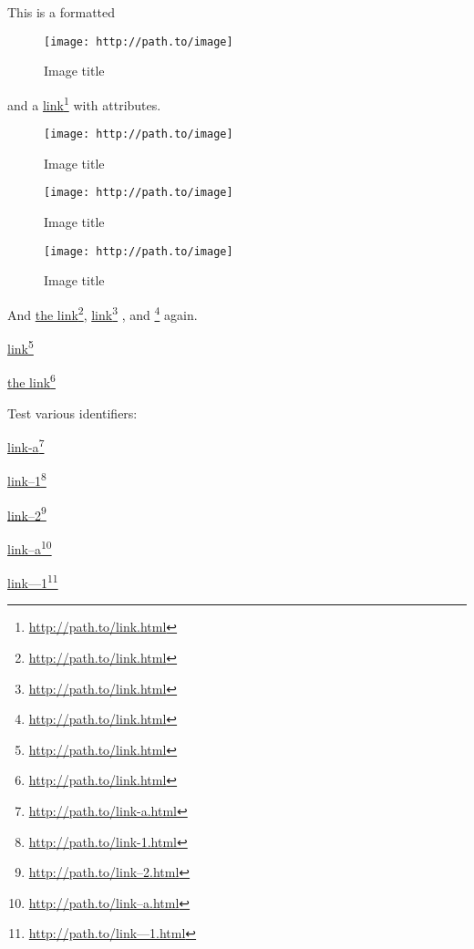 
\def\mytitle{Link Attributes Test}
\def\latexmode{memoir}

This is a formatted \begin{figure}[htbp]
\centering
\texttt{[image: http://path.to/image]}
\caption{Image title}
\label{image}
\end{figure}
 and a \href{http://path.to/link.html}{link}\footnote{\href{http://path.to/link.html}{http:\slash \slash path.to\slash link.html}} with attributes.

\begin{figure}[htbp]
\centering
\texttt{[image: http://path.to/image]}
\caption{Image title}
\label{image2}
\end{figure}


\begin{figure}[htbp]
\centering
\texttt{[image: http://path.to/image]}
\caption{Image title}
\label{image3}
\end{figure}


\begin{figure}[htbp]
\centering
\texttt{[image: http://path.to/image]}
\caption{Image title}
\label{image4}
\end{figure}


And \href{http://path.to/link.html}{the link}\footnote{\href{http://path.to/link.html}{http:\slash \slash path.to\slash link.html}}, \href{http://path.to/link.html}{link}\footnote{\href{http://path.to/link.html}{http:\slash \slash path.to\slash link.html}} , and \href{http://path.to/link.html}{}\footnote{\href{http://path.to/link.html}{http:\slash \slash path.to\slash link.html}} again.

\href{http://path.to/link.html}{link}\footnote{\href{http://path.to/link.html}{http:\slash \slash path.to\slash link.html}}

\href{http://path.to/link.html}{the link}\footnote{\href{http://path.to/link.html}{http:\slash \slash path.to\slash link.html}}

Test various identifiers:

\href{http://path.to/link-a.html}{link-a}\footnote{\href{http://path.to/link-a.html}{http:\slash \slash path.to\slash link-a.html}}

\href{http://path.to/link-1.html}{link--1}\footnote{\href{http://path.to/link-1.html}{http:\slash \slash path.to\slash link-1.html}}

\href{http://path.to/link--2.html}{link--2}\footnote{\href{http://path.to/link--2.html}{http:\slash \slash path.to\slash link--2.html}}

\href{http://path.to/link--a.html}{link--a}\footnote{\href{http://path.to/link--a.html}{http:\slash \slash path.to\slash link--a.html}}

\href{http://path.to/link---1.html}{link---1}\footnote{\href{http://path.to/link---1.html}{http:\slash \slash path.to\slash link---1.html}}




